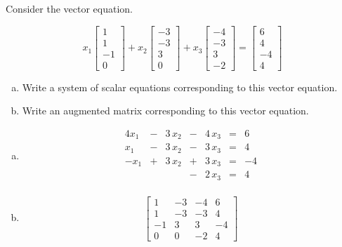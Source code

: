 
\begin{exerciseStatement}


Consider the vector equation.

\[ x_{1} \left[\begin{array}{c}
1 \\
1 \\
-1 \\
0
\end{array}\right] + x_{2} \left[\begin{array}{c}
-3 \\
-3 \\
3 \\
0
\end{array}\right] + x_{3} \left[\begin{array}{c}
-4 \\
-3 \\
3 \\
-2
\end{array}\right] = \left[\begin{array}{c}
6 \\
4 \\
-4 \\
4
\end{array}\right] \]
\begin{enumerate}[(a)]
\item  Write a system of scalar equations corresponding to this vector equation. 
\item  Write an augmented matrix corresponding to this vector equation. 
\end{enumerate}
    
\end{exerciseStatement}
    
\begin{exerciseAnswer} 

\begin{enumerate}[(a)]
\item 
\begin{alignat*}{4} x_{1} &-& 3 \, x_{2} &-& 4 \, x_{3} &=& 6 \\x_{1} &-& 3 \, x_{2} &-& 3 \, x_{3} &=& 4 \\-x_{1} &+& 3 \, x_{2} &+& 3 \, x_{3} &=& -4 \\ & &  &-& 2 \, x_{3} &=& 4 \\ \end{alignat*}
            
\item \[ \left[\begin{array}{ccc|c}
1 & -3 & -4 & 6 \\
1 & -3 & -3 & 4 \\
-1 & 3 & 3 & -4 \\
0 & 0 & -2 & 4
\end{array}\right] \]
\end{enumerate}
    
\end{exerciseAnswer}
    
